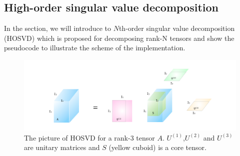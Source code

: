 \subsection{High-order singular value decomposition}
\label{hosvd}
In the section, we will introduce to $N$th-order singular value decomposition (HOSVD) which is proposed for decomposing rank-N tensors and show the pseudocode to illustrate the scheme of the implementation.
\begin{figure}[ht]
	\centering
	\includegraphics[width=1.00\textwidth]{figures/fig4311.png}
	\caption[The picture of HOSVD for a rank-3 tensor.]{The picture of HOSVD for a rank-3 tensor $A$. $U^{(1)}$,$U^{(2)}$ and $U^{(3)}$ are unitary matrices and $S$ (yellow cuboid) is a core tensor.}
	\label{fig4311}
\end{figure}

